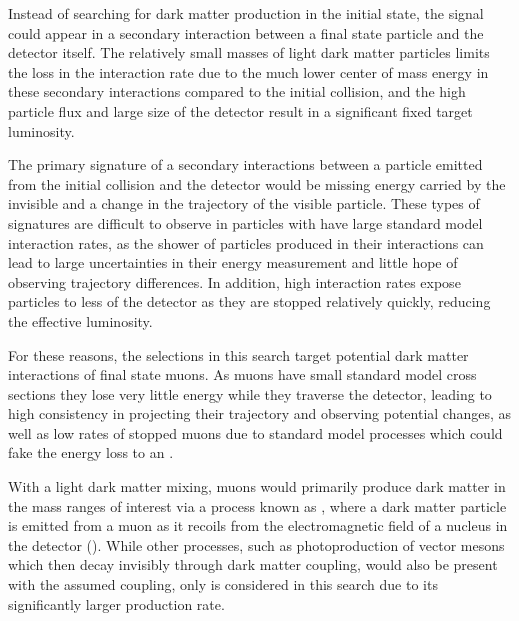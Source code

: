 Instead of searching for dark matter production in the initial state, the signal could appear in a secondary interaction between a final state particle and the detector itself.
The relatively small masses of light dark matter particles limits the loss in the interaction rate due to the much lower center of mass energy in these secondary interactions compared to the initial collision, and the high particle flux and large size of the detector result in a significant fixed target luminosity.

The primary signature of a secondary interactions between a particle emitted from the initial collision and the detector would be missing energy carried by the invisible \aprime and a change in the trajectory of the visible particle.
These types of signatures are difficult to observe in particles with have large standard model interaction rates, as the shower of particles produced in their interactions can lead to large uncertainties in their energy measurement and little hope of observing trajectory differences.
In addition, high interaction rates expose particles to less of the detector as they are stopped relatively quickly, reducing the effective luminosity.

For these reasons, the selections in this search target potential dark matter interactions of final state muons.
As muons have small standard model cross sections they lose very little energy while they traverse the detector, leading to high consistency in projecting their trajectory and observing potential changes, as well as low rates of stopped muons due to standard model processes which could fake the energy loss to an \aprime.

With a light dark matter mixing, muons would primarily produce dark matter in the mass ranges of interest via a process known as \dbrem, where a dark matter particle is emitted from a muon as it recoils from the electromagnetic field of a nucleus in the detector ().
While other processes, such as photoproduction of vector mesons which then decay invisibly through dark matter coupling, would also be present with the assumed coupling, only \dbrem is considered in this search due to its significantly larger production rate.

